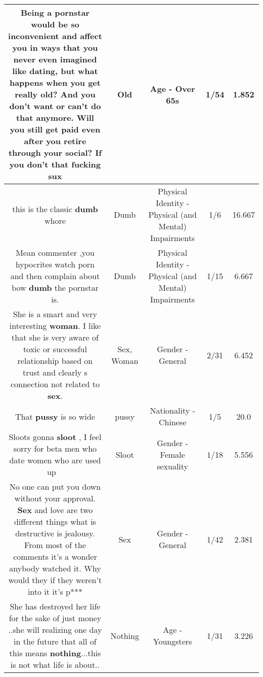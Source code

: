 \documentclass[11pt]{article}
\newlength\mylength
\begin{document}
\begin{center}
\begin{longtable}{|C{.65\mylength}|C{.30\mylength}|C{.12\mylength}|C{.12\mylength}|C{.12\mylength}|}
  \small Being a pornstar would be so inconvenient and affect you in ways that you never even imagined like dating, but what happens when you get really \textbf{old}? And you don't want or can't do that anymore. Will you still get paid even after you retire through your social? If you don't that fucking sux\normalsize   & Old & Age - Over 65s & 1/54 & 1.852 \\  \hline
  \small this is the classic \textbf{dumb} whore\normalsize   & Dumb & Physical Identity - Physical (and Mental) Impairments & 1/6 & 16.667 \\  \hline
  \small Mean commenter ,you hypocrites watch porn and then complain about bow \textbf{dumb} the pornstar is.\normalsize   & Dumb & Physical Identity - Physical (and Mental) Impairments & 1/15 & 6.667 \\  \hline
  \small She is a smart and very interesting \textbf{woman}. I like that she is very aware of toxic or successful relationship based on trust and clearly s connection not related to \textbf{sex}.\normalsize   & Sex, Woman & Gender - General & 2/31 & 6.452 \\  \hline
  \small That \textbf{pussy} is so wide\normalsize   & pussy & Nationality - Chinese & 1/5 & 20.0 \\  \hline
  \small Sloots gonna \textbf{sloot} , I feel sorry for beta men who date women who are used up 🤣😂\normalsize   & Sloot & Gender - Female sexuality & 1/18 & 5.556 \\  \hline
  \small No one can put you down without your approval. \textbf{Sex} and love are two different things what is destructive is jealousy. From most of the comments it's a wonder anybody watched it. Why would they if they weren't into it it's p***\normalsize   & Sex & Gender - General & 1/42 & 2.381 \\  \hline
  \small She has destroyed her life for the sake of just money ..she will realizing one day in the future that all of this means \textbf{nothing}...this is not what life is about..\normalsize   & Nothing & Age - Youngsters & 1/31 & 3.226 \\  \hline

\end{longtable}
\end{center}
\end{document}
